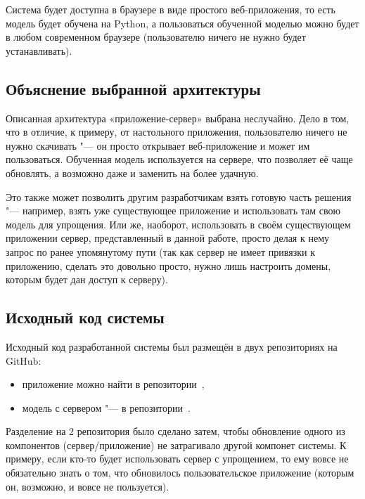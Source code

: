 Система будет доступна в браузере в виде простого веб-приложения, то есть модель будет обучена на Python, а пользоваться обученной моделью можно будет в любом современном браузере (пользователю ничего не нужно будет устанавливать).


\subsection{Объяснение выбранной архитектуры}


Описанная архитектура «приложение-сервер» выбрана неслучайно. Дело в том, что в отличие, к примеру, от настольного приложения, пользователю ничего не нужно скачивать "--- он просто открывает веб-приложение и может им пользоваться. Обученная модель используется на сервере, что позволяет её чаще обновлять, а возможно даже и заменить на более удачную.

Это также может позволить другим разработчикам взять готовую часть решения "--- например, взять уже существующее приложение и использовать там свою модель для упрощения. Или же, наоборот, использовать в своём существующем приложении сервер, представленный в данной работе, просто делая к нему запрос по ранее упомянутому пути (так как сервер не имеет привязки к приложению, сделать это довольно просто, нужно лишь настроить домены, которым будет дан доступ к серверу).


\subsection{Исходный код системы}


Исходный код разработанной системы был размещён в двух репозиториях на GitHub:
\begin{itemize}%
  \item приложение можно найти в репозитории~\cite{AppGithub},
  \item модель с сервером "--- в репозитории~\cite{ServerGithub}.
\end{itemize}

Разделение на 2 репозитория было сделано затем, чтобы обновление одного из компонентов (сервер/приложение) не затрагивало другой компонет системы.
К примеру, если кто-то будет использовать сервер с упрощением, то ему вовсе не обязательно знать о том, что обновилось пользовательское приложение (которым он, возможно, и вовсе не пользуется).


